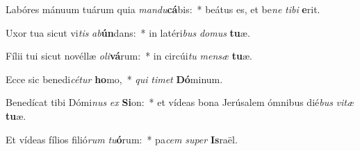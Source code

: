 \item Labóres mánuum tuárum quia \textit{man}\textit{du}\textbf{cá}bis:~* beátus es, et be\textit{ne} \textit{ti}\textit{bi} \textbf{e}rit.
\item Uxor tua sicut vi\textit{tis} \textit{ab}\textbf{ún}dans:~* in latéri\textit{bus} \textit{do}\textit{mus} \textbf{tu}æ.
\item Fílii tui sicut novéllæ \textit{o}\textit{li}\textbf{vá}rum:~* in circúi\textit{tu} \textit{men}\textit{sæ} \textbf{tu}æ.
\item Ecce sic benedi\textit{cé}\textit{tur} \textbf{ho}mo,~* \textit{qui} \textit{ti}\textit{met} \textbf{Dó}minum.
\item Benedícat tibi Dómi\textit{nus} \textit{ex} \textbf{Si}on:~* et vídeas bona Jerúsalem ómnibus dié\textit{bus} \textit{vi}\textit{tæ} \textbf{tu}æ.
\item Et vídeas fílios filió\textit{rum} \textit{tu}\textbf{ó}rum:~* pa\textit{cem} \textit{su}\textit{per} \textbf{Is}raël.
